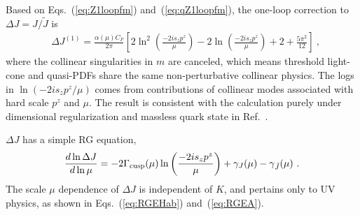 \documentclass[a4paper,11pt]{article}
\begin{document}
Based on Eqs.~(\ref{eq:Z1loopfm}) and~(\ref{eq:qZ1loopfm}), the one-loop correction to $\Delta J=J/\tilde{J}$ is
\begin{align}\label{eq:ZoverZt}
& \Delta J^{(1)} = \frac{\alpha(\mu) C_F}{2\pi} \left[ 2 \ln^2\left(\frac{-2 i s_z p^z}{\mu }\right) - 2 \ln\left(\frac{-2 i s_z p^z}{\mu }\right) + 2 + \frac{5 \pi ^2}{12} \right] \ ,
\end{align}
where the collinear singularities in $m$ are canceled, which means threshold light-cone and quasi-PDFs share the same non-perturbative collinear physics. The logs in  $\ln\left(-2 i s_z p^z/\mu\right)$ comes from contributions of collinear modes associated with hard scale $p^z$ and $\mu$. The result is consistent with the calculation purely under dimensional regularization and massless quark state in Ref.~\cite{Ji:2023pba}. 

$\Delta J$ has a simple RG equation, 
\begin{equation}
   \frac{d\ln \Delta J}{d\ln \mu} = -  2 \Gamma_{\rm cusp}(\mu) \ln\left(\frac{-2 i s_z p^z}{\mu}\right) + \gamma_J(\mu)-\gamma_{\tilde J}(\mu)  \ . 
\end{equation}
The scale $\mu$ dependence of $\Delta J$ is independent of $K$, and pertains only to UV physics, as shown in Eqs.~(\ref{eq:RGEHab}) and~(\ref{eq:RGEA}).

\end{document}
